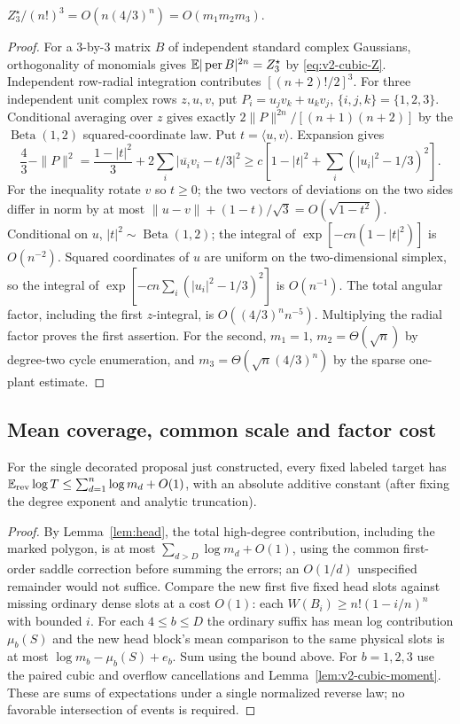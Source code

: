 \begin{lemma}\label{lem:v2-cubic-moment}
 $Z_3^\star/(n!)^3=O(n(4/3)^n)=O(m_1m_2m_3)$.
\end{lemma}
\begin{proof}
For a $3$-by-$3$ matrix $B$ of independent standard complex Gaussians,
orthogonality of monomials gives $\mathbb E|\operatorname{per} B|^{2n}=Z_3^\star$
by \eqref{eq:v2-cubic-Z}. Independent row-radial integration contributes
$[(n+2)!/2]^3$. For three independent unit complex rows $z,u,v$, put
$P_i=u_jv_k+u_kv_j$, $\{i,j,k\}=\{1,2,3\}$. Conditional averaging over
$z$ gives exactly $2\|P\|^{2n}/[(n+1)(n+2)]$ by the
$\operatorname{Beta}(1,2)$ squared-coordinate law. Put $t=\langle u,v\rangle$.
Expansion gives
\[
 \frac43-\|P\|^2=\frac{1-|t|^2}{3}
                 +2\sum_i|\overline{u_i}v_i-t/3|^2
 \ge c\left[1-|t|^2+\sum_i(|u_i|^2-1/3)^2\right].
\]
For the inequality rotate $v$ so $t\ge0$; the two vectors of deviations
on the two sides differ in norm by at most
$\|u-v\|+(1-t)/\sqrt3=O(\sqrt{1-t^2})$.
Conditional on $u$, $|t|^2\sim\operatorname{Beta}(1,2)$; the integral of
$\exp[-cn(1-|t|^2)]$ is $O(n^{-2})$. Squared coordinates of $u$ are
uniform on the two-dimensional simplex, so the integral of
$\exp[-cn\sum_i(|u_i|^2-1/3)^2]$ is $O(n^{-1})$. The total angular
factor, including the first $z$-integral, is $O((4/3)^n n^{-5})$.
Multiplying the radial factor proves the first assertion. For the second,
$m_1=1$, $m_2=\Theta(\sqrt n)$ by degree-two cycle enumeration, and
$m_3=\Theta(\sqrt n(4/3)^n)$ by the sparse one-plant estimate.
\end{proof}

\subsection{Mean coverage, common scale and factor cost}

\begin{proposition}\label{prop:mean-cover}
For the single decorated proposal just constructed, every fixed labeled
target has $\mathbb E_{\rm rev}\log T\le\sum_{d=1}^n\log m_d+O(1)$,
with an absolute additive constant (after fixing the degree exponent
and analytic truncation).
\end{proposition}
\begin{proof}
By Lemma~\ref{lem:head}, the total high-degree contribution, including the marked polygon, is at most
 $\sum_{d>D}\log m_d+O(1)$, using the common
first-order saddle correction before summing the errors; an $O(1/d)$
unspecified remainder would not suffice. Compare the new first five
fixed head slots against missing ordinary dense slots at a cost $O(1)$:
each $W(B_i)\ge n!(1-i/n)^n$ with bounded $i$. For each $4\le b\le D$
the ordinary suffix has mean log contribution $\mu_b(S)$ and the new
head block's mean comparison to the same physical slots is at most
$\log m_b-\mu_b(S)+e_b$. Sum using the bound above. For $b=1,2,3$
use the paired cubic and overflow cancellations and
Lemma~\ref{lem:v2-cubic-moment}. These are sums of expectations under
a single normalized reverse law; no favorable intersection of events
is required.
\end{proof}

